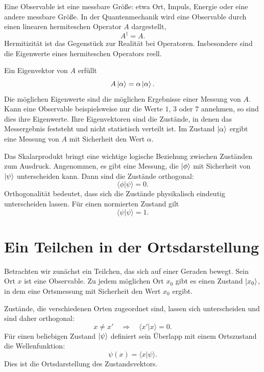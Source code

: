 Eine Observable ist eine messbare Größe: etwa Ort, Impuls, Energie oder eine andere messbare Größe. In der Quantenmechanik wird eine Observable durch einen linearen hermiteschen Operator \(A\) dargestellt,
\begin{equation}
A^\dagger=A.
\end{equation}
Hermitizität ist das Gegenstück zur Realität bei Operatoren. Insbesondere sind die Eigenwerte eines hermiteschen Operators reell.

Ein Eigenvektor von \(A\) erfüllt
\begin{equation}
A\left\lvert\alpha\right\rangle=\alpha\left\lvert\alpha\right\rangle.
\end{equation}
Die möglichen Eigenwerte sind die möglichen Ergebnisse einer Messung von \(A\). Kann eine Observable beispielsweise nur die Werte \(1\), \(3\) oder \(7\) annehmen, so sind dies ihre Eigenwerte. Ihre Eigenvektoren sind die Zustände, in denen das Messergebnis feststeht und nicht statistisch verteilt ist. Im Zustand \(\left\lvert\alpha\right\rangle\) ergibt eine Messung von \(A\) mit Sicherheit den Wert \(\alpha\).

Das Skalarprodukt bringt eine wichtige logische Beziehung zwischen Zuständen zum Ausdruck. Angenommen, es gibt eine Messung, die \(\left\lvert\phi\right\rangle\) mit Sicherheit von \(\left\lvert\psi\right\rangle\) unterscheiden kann. Dann sind die Zustände orthogonal:
\begin{equation}
\langle\phi|\psi\rangle=0.
\end{equation}
Orthogonalität bedeutet, dass sich die Zustände physikalisch eindeutig unterscheiden lassen. Für einen normierten Zustand gilt
\begin{equation}
\langle\psi|\psi\rangle=1.
\end{equation}

\section{Ein Teilchen in der Ortsdarstellung}

Betrachten wir zunächst ein Teilchen, das sich auf einer Geraden bewegt. Sein Ort \(x\) ist eine Observable. Zu jedem möglichen Ort \(x_0\) gibt es einen Zustand \(\left\lvert x_0\right\rangle\), in dem eine Ortsmessung mit Sicherheit den Wert \(x_0\) ergibt.

Zustände, die verschiedenen Orten zugeordnet sind, lassen sich unterscheiden und sind daher orthogonal:
\begin{equation}
x\neq x'
\quad\Longrightarrow\quad
\langle x'|x\rangle=0.
\end{equation}
Für einen beliebigen Zustand \(\left\lvert\psi\right\rangle\) definiert sein Überlapp mit einem Ortszustand die Wellenfunktion:
\begin{equation}
\psi(x)=\langle x|\psi\rangle.
\end{equation}
Dies ist die Ortsdarstellung des Zustandsvektors.

